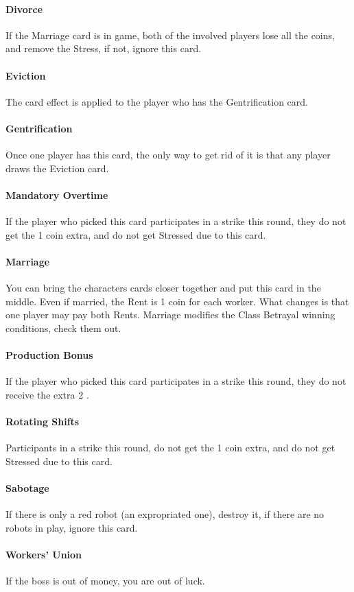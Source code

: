     \paragraph{Divorce}
        If the Marriage card is in game, both of the involved players lose all the
        coins, and remove the Stress, if not, ignore this card.
    \paragraph{Eviction}
        The card effect is applied to the player who has the Gentrification card.
    \paragraph{Gentrification}
        Once one player has this card, the only way to get rid of it is that
any player draws the Eviction card.
    \paragraph{Mandatory Overtime}
        If the player who picked this card participates in a strike
        this round, they do not get the 1 coin extra, and do not get Stressed due to this
        card.
    \paragraph{Marriage}
        You can bring the characters cards closer together and put this card
        in the middle. Even if married, the Rent is 1 coin for each worker. What changes
        is that one player may pay both Rents. Marriage modifies the Class Betrayal winning
        conditions, check them out.
    \paragraph{Production Bonus}
        If the player who picked this card participates in a strike this
        round, they do not receive the extra 2 \faRubleSign.
    \paragraph{Rotating Shifts}
        Participants in a strike this round, do not get the 1 coin extra,
        and do not get Stressed due to this card.
    \paragraph{Sabotage}
        If there is only a red robot (an expropriated one), destroy it, if there
        are no robots in play, ignore this card.
    \paragraph{Workers' Union}
        If the boss is out of money, you are out of luck.



